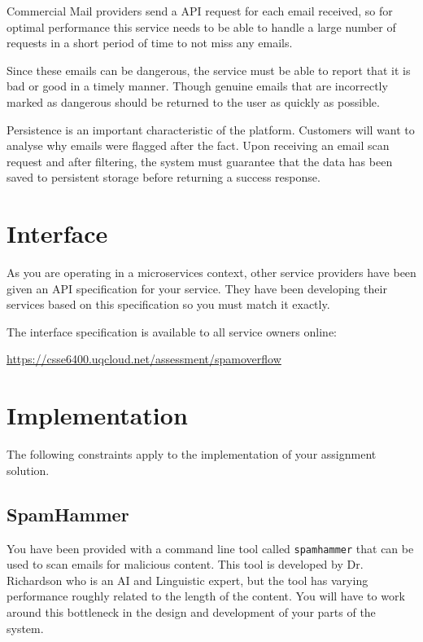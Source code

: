 \documentclass{csse4400}
\begin{document}
Commercial Mail providers send a API request for each email received, so for optimal performance this service needs to be able to handle a large number of requests in a short period of time to not miss any emails.

Since these emails can be dangerous, the service must be able to report that it is bad or good in a timely manner. Though genuine emails that are incorrectly marked as dangerous should be returned to the user as quickly as possible.

Persistence is an important characteristic of the platform. Customers will want to analyse why emails were flagged after the fact. Upon receiving an email scan request and after filtering, the system must guarantee that the data has been saved to persistent storage before returning a success response.

\section{Interface}
As you are operating in a microservices context, other service providers have been given an API specification for your service. They have been developing their services based on this specification so you must match it exactly.

The interface specification is available to all service owners online: 

\url{https://csse6400.uqcloud.net/assessment/spamoverflow}

\section{Implementation}
The following constraints apply to the implementation of your assignment solution.

\subsection{SpamHammer}


You have been provided with a command line tool called \texttt{spamhammer} that can be used to scan emails for malicious content. This tool is developed by Dr. Richardson who is an AI and Linguistic expert, but the tool has varying performance roughly related to the length of the content. You will have to work around this bottleneck in the design and development of your parts of the system.
\end{document}
